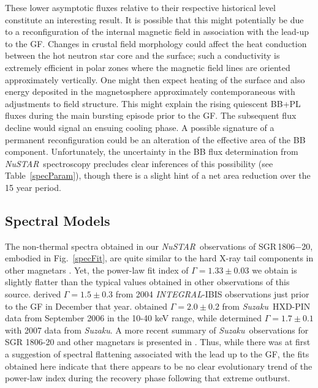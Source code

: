 \documentclass[twocolumn]{aastex6}
\newcommand {\nustar} {\textsl{NuSTAR}}
\newcommand {\suzaku} {\textsl{Suzaku}}
\newcommand {\integral} {\textsl{INTEGRAL}}
\def \src {SGR\,1806$-$20}
\begin{document}
These lower asymptotic fluxes relative to their respective historical
level constitute an interesting result. It is possible that this might
potentially be due to a reconfiguration of the internal magnetic field
in association with the lead-up to the GF. Changes in crustal field
morphology could affect the heat conduction between the hot neutron
star core and the surface; such a conductivity is extremely efficient
in polar zones where the magnetic field lines are oriented
approximately vertically. One might then expect heating of the surface
and also energy deposited in the magnetosphere approximately
contemporaneous with adjustments to field structure.  This might
explain the rising quiescent BB+PL fluxes during the main bursting
episode prior to the GF. The subsequent flux decline would signal an
ensuing cooling phase. A possible signature of a permanent
reconfiguration could be an alteration of the effective area of the BB
component.  Unfortunately, the uncertainty in the BB flux
determination from \nustar\ spectroscopy precludes clear inferences of
this possibility (see Table~\ref{specParam}), though there is a slight
hint of a net area reduction over the 15 year period.

\subsection{Spectral Models}

The non-thermal spectra obtained in our \nustar\ observations of \src,
embodied in Fig.~\ref{specFit}, are quite similar to the hard X-ray
tail components in other magnetars \citep[e.g.,
see][]{gotz06AA:1900,enoto10ApJ,vogel14ApJ:2259,tendulkar15ApJ:0142,
  younes17:1935,enoto17ApJS}. Yet, the power-law fit index of $\Gamma
= 1.33\pm 0.03$ we obtain is slightly flatter than the typical values
obtained in other observations of this source. \citet{
  mereghetti05ApJ:1806} derived $\Gamma = 1.5 \pm 0.3$ from 2004
\integral-IBIS observations just prior to the GF in December
that year. \citep{esposito07AA:1806} obtained $\Gamma = 2.0 \pm 0.2$
from \suzaku\ HXD-PIN data from September 2006 in the 10-40 keV range,
while \citep{enoto10ApJ} determined $\Gamma = 1.7 \pm 0.1$ with 2007
data from \suzaku.  A more recent summary of \suzaku\ observations for
SGR 1806-20 and other magnetars is presented in \citep{enoto17ApJS}.
Thus, while there was at first a suggestion of spectral flattening
associated with the lead up to the GF, the fits obtained here
indicate that there appears to be no clear evolutionary trend of the
power-law index during the recovery phase following that extreme
outburst.
\end{document}
